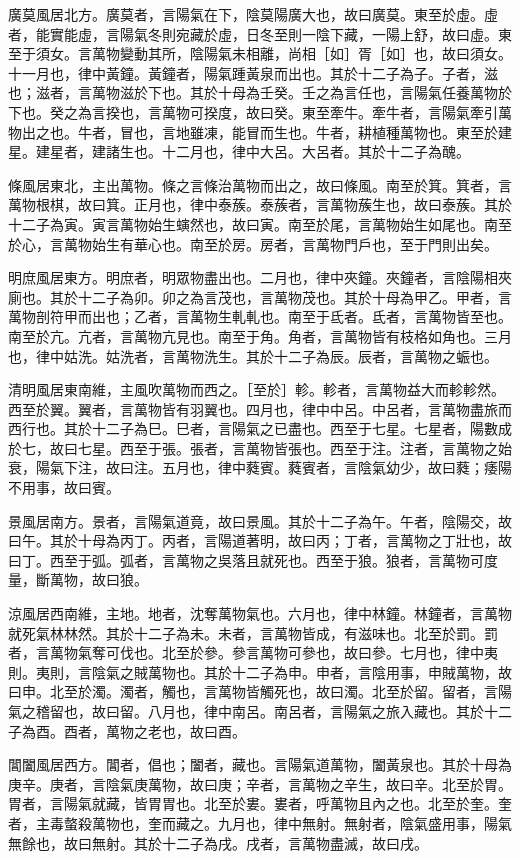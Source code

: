 \begin{pinyinscope}
廣莫風居北方。廣莫者，言陽氣在下，陰莫陽廣大也，故曰廣莫。東至於虛。虛者，能實能虛，言陽氣冬則宛藏於虛，日冬至則一陰下藏，一陽上舒，故曰虛。東至于須女。言萬物變動其所，陰陽氣未相離，尚相［如］胥［如］也，故曰須女。十一月也，律中黃鐘。黃鐘者，陽氣踵黃泉而出也。其於十二子為子。子者，滋也；滋者，言萬物滋於下也。其於十母為壬癸。壬之為言任也，言陽氣任養萬物於下也。癸之為言揆也，言萬物可揆度，故曰癸。東至牽牛。牽牛者，言陽氣牽引萬物出之也。牛者，冒也，言地雖凍，能冒而生也。牛者，耕植種萬物也。東至於建星。建星者，建諸生也。十二月也，律中大呂。大呂者。其於十二子為醜。

條風居東北，主出萬物。條之言條治萬物而出之，故曰條風。南至於箕。箕者，言萬物根棋，故曰箕。正月也，律中泰蔟。泰蔟者，言萬物蔟生也，故曰泰蔟。其於十二子為寅。寅言萬物始生螾然也，故曰寅。南至於尾，言萬物始生如尾也。南至於心，言萬物始生有華心也。南至於房。房者，言萬物門戶也，至于門則出矣。

明庶風居東方。明庶者，明眾物盡出也。二月也，律中夾鐘。夾鐘者，言陰陽相夾廁也。其於十二子為卯。卯之為言茂也，言萬物茂也。其於十母為甲乙。甲者，言萬物剖符甲而出也；乙者，言萬物生軋軋也。南至于氐者。氐者，言萬物皆至也。南至於亢。亢者，言萬物亢見也。南至于角。角者，言萬物皆有枝格如角也。三月也，律中姑洗。姑洗者，言萬物洗生。其於十二子為辰。辰者，言萬物之蜄也。

清明風居東南維，主風吹萬物而西之。［至於］軫。軫者，言萬物益大而軫軫然。西至於翼。翼者，言萬物皆有羽翼也。四月也，律中中呂。中呂者，言萬物盡旅而西行也。其於十二子為巳。巳者，言陽氣之已盡也。西至于七星。七星者，陽數成於七，故曰七星。西至于張。張者，言萬物皆張也。西至于注。注者，言萬物之始衰，陽氣下注，故曰注。五月也，律中蕤賓。蕤賓者，言陰氣幼少，故曰蕤；痿陽不用事，故曰賓。

景風居南方。景者，言陽氣道竟，故曰景風。其於十二子為午。午者，陰陽交，故曰午。其於十母為丙丁。丙者，言陽道著明，故曰丙；丁者，言萬物之丁壯也，故曰丁。西至于弧。弧者，言萬物之吳落且就死也。西至于狼。狼者，言萬物可度量，斷萬物，故曰狼。

涼風居西南維，主地。地者，沈奪萬物氣也。六月也，律中林鐘。林鐘者，言萬物就死氣林林然。其於十二子為未。未者，言萬物皆成，有滋味也。北至於罰。罰者，言萬物氣奪可伐也。北至於參。參言萬物可參也，故曰參。七月也，律中夷則。夷則，言陰氣之賊萬物也。其於十二子為申。申者，言陰用事，申賊萬物，故曰申。北至於濁。濁者，觸也，言萬物皆觸死也，故曰濁。北至於留。留者，言陽氣之稽留也，故曰留。八月也，律中南呂。南呂者，言陽氣之旅入藏也。其於十二子為酉。酉者，萬物之老也，故曰酉。

閶闔風居西方。閶者，倡也；闔者，藏也。言陽氣道萬物，闔黃泉也。其於十母為庚辛。庚者，言陰氣庚萬物，故曰庚；辛者，言萬物之辛生，故曰辛。北至於胃。胃者，言陽氣就藏，皆胃胃也。北至於婁。婁者，呼萬物且內之也。北至於奎。奎者，主毒螫殺萬物也，奎而藏之。九月也，律中無射。無射者，陰氣盛用事，陽氣無餘也，故曰無射。其於十二子為戌。戌者，言萬物盡滅，故曰戌。


\end{pinyinscope}
